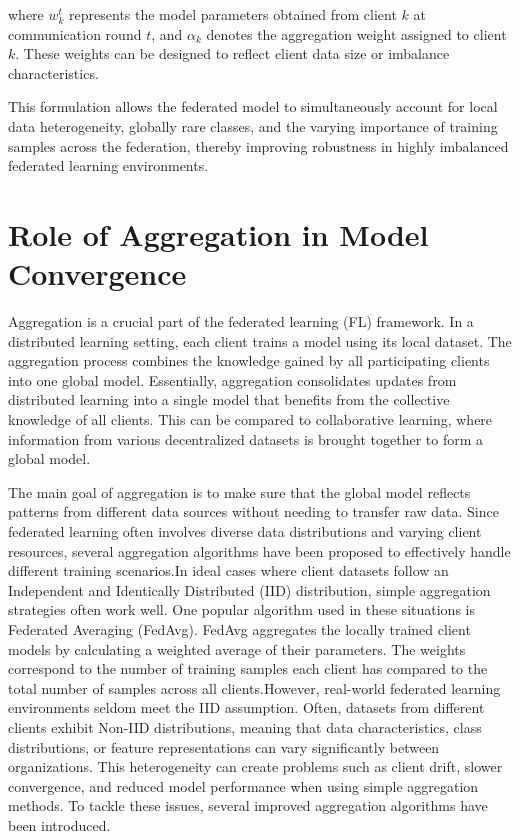 \documentclass[12pt]{book}
\begin{document}
where \(w_k^{t}\) represents the model parameters obtained from client \(k\) at communication round \(t\), and \(\alpha_k\) denotes the aggregation weight assigned to client \(k\). These weights can be designed to reflect client data size or imbalance characteristics.

This formulation allows the federated model to simultaneously account for local data heterogeneity, globally rare classes, and the varying importance of training samples across the federation, thereby improving robustness in highly imbalanced federated learning environments.



\section{Role of Aggregation in Model Convergence}


Aggregation is a crucial part of the federated learning (FL) framework. In a distributed learning setting, each client trains a model using its local dataset. The aggregation process combines the knowledge gained by all participating clients into one global model. Essentially, aggregation consolidates updates from distributed learning into a single model that benefits from the collective knowledge of all clients. This can be compared to collaborative learning, where information from various decentralized datasets is brought together to form a global model.

The main goal of aggregation is to make sure that the global model reflects patterns from different data sources without needing to transfer raw data. Since federated learning often involves diverse data distributions and varying client resources, several aggregation algorithms have been proposed to effectively handle different training scenarios.In ideal cases where client datasets follow an Independent and Identically Distributed (IID) distribution, simple aggregation strategies often work well. One popular algorithm used in these situations is Federated Averaging (FedAvg). FedAvg aggregates the locally trained client models by calculating a weighted average of their parameters. The weights correspond to the number of training samples each client has compared to the total number of samples across all clients.However, real-world federated learning environments seldom meet the IID assumption. Often, datasets from different clients exhibit Non-IID distributions, meaning that data characteristics, class distributions, or feature representations can vary significantly between organizations. This heterogeneity can create problems such as client drift, slower convergence, and reduced model performance when using simple aggregation methods. To tackle these issues, several improved aggregation algorithms have been introduced.
\end{document}
